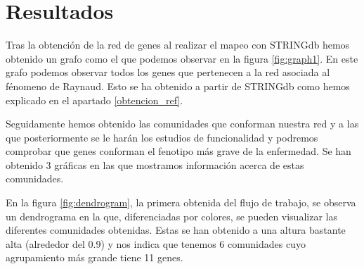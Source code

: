 \section{Resultados}

Tras la obtención de la red de genes al realizar el mapeo con STRINGdb hemos obtenido un grafo como el que podemos observar en la figura \ref{fig:graph1}. En este grafo podemos observar todos los genes que pertenecen a la red asociada al fénomeno de Raynaud. Esto se ha obtenido a partir de STRINGdb como hemos explicado en el apartado \ref{obtencion_ref}.

\begin{minipage}{\linewidth}
	\label{fig:graph1}
\end{minipage}

Seguidamente hemos obtenido las comunidades que conforman nuestra red y a las que posteriormente se le harán los estudios de funcionalidad y podremos comprobar que genes conforman el fenotipo más grave de la enfermedad. Se han obtenido 3 gráficas en las que mostramos información acerca de estas comunidades.

En la figura \ref{fig:dendrogram}, la primera obtenida del flujo de trabajo, se observa un dendrograma en la que, diferenciadas por colores, se pueden visualizar las diferentes comunidades obtenidas. Estas se han obtenido a una altura bastante alta (alrededor del 0.9) y nos indica que tenemos 6 comunidades cuyo agrupamiento más grande tiene 11 genes.

